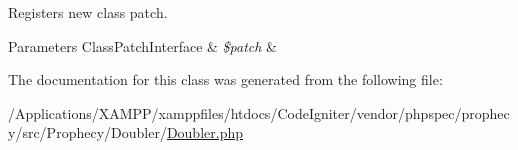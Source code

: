 Registers new class patch.


\begin{DoxyParams}[1]{Parameters}
Class\+Patch\+Interface & {\em \$patch} & \\
\hline
\end{DoxyParams}


The documentation for this class was generated from the following file\+:\begin{DoxyCompactItemize}
\item 
/\+Applications/\+X\+A\+M\+P\+P/xamppfiles/htdocs/\+Code\+Igniter/vendor/phpspec/prophecy/src/\+Prophecy/\+Doubler/\mbox{\hyperlink{_doubler_8php}{Doubler.\+php}}\end{DoxyCompactItemize}
